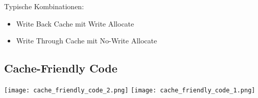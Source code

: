 Typische Kombinationen:
\begin{itemize}
    \itemsep-.5em 
    \item Write Back Cache mit Write Allocate
    \item Write Through Cache mit No-Write Allocate
\end{itemize}


\subsection{Cache-Friendly Code}

\texttt{[image: cache\_friendly\_code\_2.png]}
\texttt{[image: cache\_friendly\_code\_1.png]}